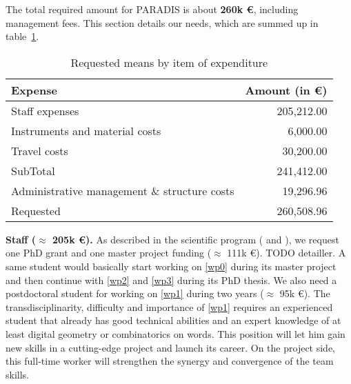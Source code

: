 
The total required amount for PARADIS is about \textbf{260k \euro}, including management fees.
This section details our needs, which are summed up in table~\ref{tab:grant}.

\begin{table}[htbp]
  \caption{Requested means by item of expenditure}
  \centering
  \begin{tabular}{|l|r|}
    \hline 
    Expense                                      & Amount (in \euro) \\ \hline \hline
    Staff expenses                               & 205,212.00 \\ \hline
    Instruments and material costs               & 6,000.00  \\ \hline
    Travel costs                                 & 30,200.00  \\  \hline
    SubTotal                                     & 241,412.00 \\ \hline \hline
    Administrative management \& structure costs & 19,296.96 \\ \hline \hline
    Requested                                    & 260,508.96 \\ \hline
    \hline
  \end{tabular}
  \label{tab:grant}
\end{table}

\textbf{Staff ($\approx$ 205k \euro).} As described in the scientific program ( and ),
we request one PhD grant and one master project funding ($\approx$ 111k \euro). TODO detailler.
A same student would basically start working on \ref{wp0} during its master project and then
continue with \ref{wp2} and \ref{wp3} during its PhD thesis.
We also need a postdoctoral student for working on \ref{wp1} during two years ($\approx$ 95k \euro). 
The transdisciplinarity, difficulty and importance of \ref{wp1} requires an experienced student
that already has good technical abilities and an expert knowledge of at least digital geometry
or combinatorics on words. This position will let him gain new skills in a cutting-edge project
and launch its career. On the project side, this full-time worker will strengthen the synergy and
convergence of the team skills. 

